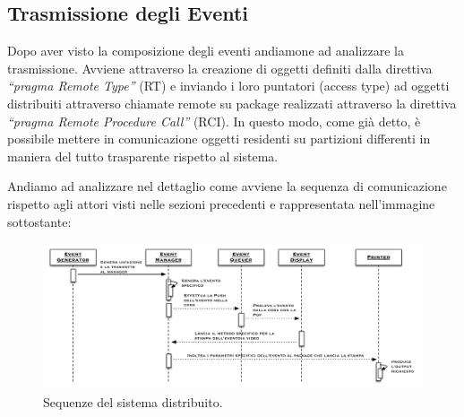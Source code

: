 \documentclass[aps,letterpaper,10pt]{article}
\begin{document}
\subsection{Trasmissione degli Eventi}

Dopo aver visto la composizione degli eventi andiamone ad analizzare la trasmissione. Avviene attraverso la creazione di
oggetti definiti dalla direttiva \textit
{``pragma Remote Type''} (RT) e inviando i loro puntatori (access type) ad oggetti distribuiti attraverso chiamate
remote su package realizzati attraverso la direttiva \textit{``pragma Remote Procedure Call''} (RCI). In questo modo,
come gi\`a detto, \`e possibile mettere in comunicazione oggetti residenti su partizioni differenti in maniera del tutto
trasparente rispetto al sistema. \vspace{3mm}

Andiamo ad analizzare nel dettaglio come avviene la sequenza di comunicazione rispetto agli attori visti nelle sezioni
precedenti e rappresentata nell'immagine sottostante:

\begin{figure}[H]
	\begin{center}
		\includegraphics[width=480px]{images/dist-sequence.pdf}
	\end{center}
\caption{Sequenze del sistema distribuito.}
\end{figure}
\end{document}
